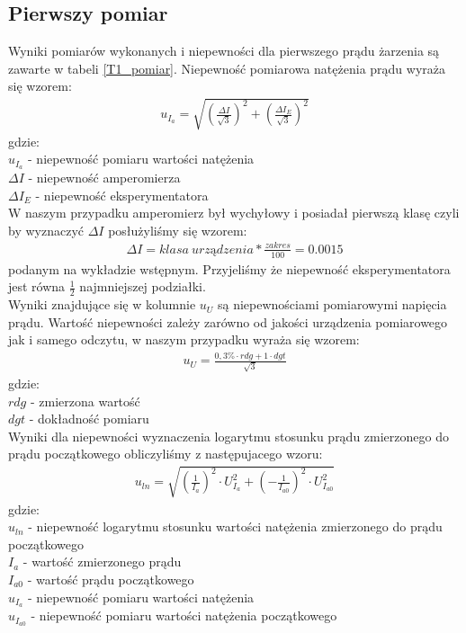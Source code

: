 \documentclass[a4paper]{article}
\newlength{\du}
\begin{document}
\subsection{Pierwszy pomiar}
Wyniki pomiarów wykonanych i niepewności dla pierwszego prądu żarzenia są zawarte w tabeli \ref{T1_pomiar}. Niepewność pomiarowa natężenia prądu wyraża się wzorem: 
\begin{align*}
u_{I_{a}} = \sqrt{(\frac{\Delta I}{\sqrt{3}})^2 + (\frac{\Delta I_{E}}{\sqrt{3}})^2}
\end{align*}
gdzie:\\
$u_{I_{a}}$ - niepewność pomiaru wartości natężenia \\
$\Delta I$ - niepewność amperomierza \\
$\Delta I_{E}$ - niepewność eksperymentatora\\

W naszym przypadku amperomierz był wychyłowy i posiadał pierwszą klasę czyli by wyznaczyć $\Delta I$ posłużyliśmy się wzorem:
\begin{align*}
\Delta I = klasa\ urządzenia * \frac{zakres}{100} = 0.0015
\end{align*}
podanym na wykładzie wstępnym.
Przyjeliśmy że niepewność eksperymentatora jest równa $\frac{1}{2}$ najmniejszej podziałki.\\

Wyniki znajdujące się w kolumnie $u_{U}$ są niepewnościami pomiarowymi napięcia prądu. Wartość niepewności zależy zarówno od jakości urządzenia pomiarowego jak i samego odczytu, w naszym przypadku wyraża się wzorem:
\begin{align*}
u_{U} = \frac{0,3 \% \cdot rdg + 1 \cdot dgt}{\sqrt{3}}
\end{align*}
gdzie: \\
$rdg$ - zmierzona wartość \\
$dgt$ - dokładność pomiaru \\

Wyniki dla niepewności wyznaczenia logarytmu stosunku prądu zmierzonego do prądu początkowego obliczyliśmy z następujacego wzoru:
\begin{align*}
u_{ln} = \sqrt{(\frac{1}{I_{a}})^2 \cdot U_{I_{a}}^2 + (- \frac{1}{I_{a0}})^2 \cdot U_{I_{a0}}^2 }
\end{align*}
gdzie:\\
$u_{ln}$ - niepewność logarytmu stosunku wartości natężenia zmierzonego do prądu początkowego \\
$I_{a}$ - wartość zmierzonego prądu\\
$I_{a0}$ - wartość prądu początkowego\\
$u_{I_{a}}$ - niepewność pomiaru wartości natężenia \\
$u_{I_{a0}}$ - niepewność pomiaru wartości natężenia początkowego \\
\end{document}
